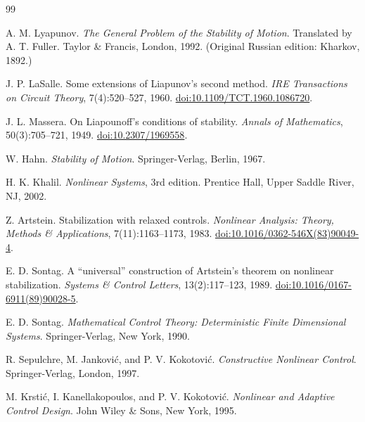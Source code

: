 \documentclass[11pt, a4paper, UTF8, fontset=none]{ctexart}
\theoremstyle{cnthm}
\begin{document}
\begin{thebibliography}{99}

A. M. Lyapunov.
\newblock \emph{The General Problem of the Stability of Motion}.
\newblock Translated by A. T. Fuller. Taylor \& Francis, London, 1992.
\newblock (Original Russian edition: Kharkov, 1892.)

J. P. LaSalle.
\newblock Some extensions of Liapunov's second method.
\newblock \emph{IRE Transactions on Circuit Theory}, 7(4):520--527, 1960.
\newblock \href{https://doi.org/10.1109/TCT.1960.1086720}{doi:10.1109/TCT.1960.1086720}.

J. L. Massera.
\newblock On Liapounoff's conditions of stability.
\newblock \emph{Annals of Mathematics}, 50(3):705--721, 1949.
\newblock \href{https://doi.org/10.2307/1969558}{doi:10.2307/1969558}.

W. Hahn.
\newblock \emph{Stability of Motion}.
\newblock Springer-Verlag, Berlin, 1967.

H. K. Khalil.
\newblock \emph{Nonlinear Systems}, 3rd edition.
\newblock Prentice Hall, Upper Saddle River, NJ, 2002.

Z. Artstein.
\newblock Stabilization with relaxed controls.
\newblock \emph{Nonlinear Analysis: Theory, Methods \& Applications}, 7(11):1163--1173, 1983.
\newblock \href{https://doi.org/10.1016/0362-546X(83)90049-4}{doi:10.1016/0362-546X(83)90049-4}.

E. D. Sontag.
\newblock A ``universal'' construction of Artstein's theorem on nonlinear stabilization.
\newblock \emph{Systems \& Control Letters}, 13(2):117--123, 1989.
\newblock \href{https://doi.org/10.1016/0167-6911(89)90028-5}{doi:10.1016/0167-6911(89)90028-5}.

E. D. Sontag.
\newblock \emph{Mathematical Control Theory: Deterministic Finite Dimensional Systems}.
\newblock Springer-Verlag, New York, 1990.

R. Sepulchre, M. Jankovi\'c, and P. V. Kokotovi\'c.
\newblock \emph{Constructive Nonlinear Control}.
\newblock Springer-Verlag, London, 1997.

M. Krsti\'c, I. Kanellakopoulos, and P. V. Kokotovi\'c.
\newblock \emph{Nonlinear and Adaptive Control Design}.
\newblock John Wiley \& Sons, New York, 1995.


\end{thebibliography}
\end{document}
